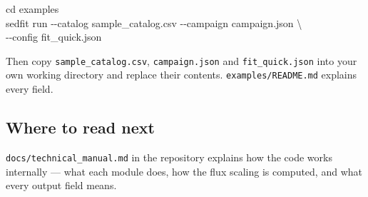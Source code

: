 \documentclass[11pt]{article}
\begin{document}
\begin{cmd}\ttfamily
cd examples\\
sedfit run -{}-catalog sample\_catalog.csv -{}-campaign campaign.json \textbackslash\\
\hspace*{4em}-{}-config fit\_quick.json
\end{cmd}

Then copy \texttt{sample\_catalog.csv}, \texttt{campaign.json} and
\texttt{fit\_quick.json} into your own working directory and replace
their contents. \texttt{examples/README.md} explains every field.

\subsection{Where to read next}

\texttt{docs/technical\_manual.md} in the repository explains how the code
works internally --- what each module does, how the flux scaling is
computed, and what every output field means.
\end{document}
